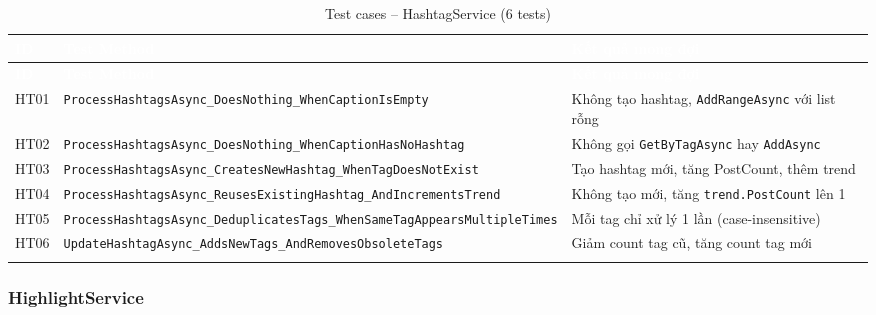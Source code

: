 \documentclass[a4paper]{article}
\begin{document}
\begin{longtable}{|C{0.8cm}|L{5.4cm}|L{7.4cm}|}
\hline
{}
\textcolor{white}{\textbf{ID}} &
\textcolor{white}{\textbf{Test Method}} &
\textcolor{white}{\textbf{Kết quả mong đợi}} \\
\hline
\endfirsthead
\hline
{}
\textcolor{white}{\textbf{ID}} &
\textcolor{white}{\textbf{Test Method}} &
\textcolor{white}{\textbf{Kết quả mong đợi}} \\
\hline
\endhead
\hline
\endfoot

HT01 & \texttt{ProcessHashtagsAsync\_DoesNothing\_WhenCaptionIsEmpty} & Không tạo hashtag, \texttt{AddRangeAsync} với list rỗng \\
\hline
HT02 & \texttt{ProcessHashtagsAsync\_DoesNothing\_WhenCaptionHasNoHashtag} & Không gọi \texttt{GetByTagAsync} hay \texttt{AddAsync} \\
\hline
{}
HT03 & \texttt{ProcessHashtagsAsync\_CreatesNewHashtag\_WhenTagDoesNotExist} & Tạo hashtag mới, tăng PostCount, thêm trend \\
\hline
HT04 & \texttt{ProcessHashtagsAsync\_ReusesExistingHashtag\_AndIncrementsTrend} & Không tạo mới, tăng \texttt{trend.PostCount} lên 1 \\
\hline
{}
HT05 & \texttt{ProcessHashtagsAsync\_DeduplicatesTags\_WhenSameTagAppearsMultipleTimes} & Mỗi tag chỉ xử lý 1 lần (case-insensitive) \\
\hline
HT06 & \texttt{UpdateHashtagAsync\_AddsNewTags\_AndRemovesObsoleteTags} & Giảm count tag cũ, tăng count tag mới \\
\hline
\caption{Test cases -- HashtagService (6 tests)}
\end{longtable}

\subsubsection{HighlightService}
\end{document}
